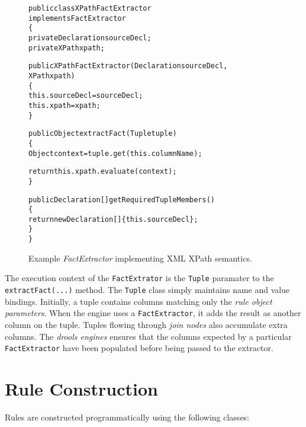 \documentclass[10pt,letterpaper]{article}
\newenvironment{codelisting}%
	{\begin{minipage}{250pt}\small\begin{alltt}}%
	{\end{alltt}\end{minipage}}
\begin{document}
\begin{figure*}
	\begin{codelisting}
	public class XPathFactExtractor 
	             implements FactExtractor
	\{
	     private Declaration sourceDecl;
	     private XPath       xpath;

	     public XPathFactExtractor(Declaration sourceDecl,
	                               XPath xpath)
	     \{
	          this.sourceDecl = sourceDecl;
	          this.xpath      = xpath;
	     \}

	     public Object extractFact(Tuple tuple)
	     \{
	          Object context = tuple.get( this.columnName );

	          return this.xpath.evaluate( context );
	     \}

	     public Declaration[] getRequiredTupleMembers()
	     \{
	          return new Declaration[] \{ this.sourceDecl \};
	     \}
	\}
	\end{codelisting}
	\caption{Example \emph{FactExtractor} implementing XML XPath semantics.}
	\label{semantic.fact-extractor.xml-example}
\end{figure*}

The execution context of the \verb|FactExtrator| is the \verb|Tuple|
paramater to the \verb|extractFact(...)| method.  The \verb|Tuple|
class simply maintains name and value bindings.  Initially, a tuple
contains columns matching only the \emph{rule object parameters}.
When the engine uses a \verb|FactExtractor|, it adds the result as
another column on the tuple.  Tuples flowing through \emph{join nodes}
also accumulate extra columns. The \emph{drools engines} ensures that
the columns expected by a particular \verb|FactExtractor| have been
populated before being passed to the extractor. 

\section{Rule Construction}

Rules are constructed programmatically using the following classes:
\end{document}
